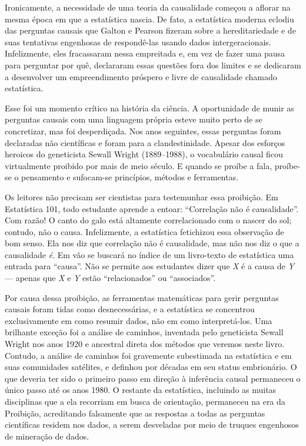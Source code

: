 \documentclass[11pt,a5paper,twoside]{book}
\begin{document}
Ironicamente, a necessidade de uma teoria da causalidade começou a aflorar na mesma época em que a estatística nascia. De fato, a estatística moderna eclodiu das perguntas causais que Galton e Pearson fizeram sobre a hereditariedade e de suas tentativas engenhosas de respondê-las usando dados intergeracionais. Infelizmente, eles fracassaram nessa empreitada e, em vez de fazer uma pausa para perguntar por quê, declararam essas questões fora dos limites e se dedicaram a desenvolver um empreendimento próspero e livre de causalidade chamado estatística.

Esse foi um momento crítico na história da ciência. A oportunidade de munir as perguntas causais com uma linguagem própria esteve muito perto de se concretizar, mas foi desperdiçada. Nos anos seguintes, essas perguntas foram declaradas não científicas e foram para a clandestinidade. Apesar dos esforços heroicos do geneticista Sewall Wright (1889–1988), o vocabulário causal ficou virtualmente proibido por mais de meio século. E quando se proíbe a fala, proíbe-se o pensamento e sufocam-se princípios, métodos e ferramentas.

Os leitores não precisam ser cientistas para testemunhar essa proibição. Em Estatística 101, todo estudante aprende a entoar: “Correlação não é causalidade”. Com razão! O canto do galo está altamente correlacionado com o nascer do sol; contudo, não o causa. Infelizmente, a estatística fetichizou essa observação de bom senso. Ela nos diz que correlação não é causalidade, mas não nos diz o que a causalidade \textit{é}. Em vão se buscará no índice de um livro-texto de estatística uma entrada para “causa”. Não se permite aos estudantes dizer que \textit{X} é a causa de \textit{Y} — apenas que \textit{X} e \textit{Y} estão “relacionados” ou “associados”.

Por causa dessa proibição, as ferramentas matemáticas para gerir perguntas causais foram tidas como desnecessárias, e a estatística se concentrou exclusivamente em como resumir dados, não em como interpretá-los. Uma brilhante exceção foi a análise de caminhos, inventada pelo geneticista Sewall Wright nos anos 1920 e ancestral direta dos métodos que veremos neste livro. Contudo, a análise de caminhos foi gravemente subestimada na estatística e em suas comunidades satélites, e definhou por décadas em seu status embrionário. O que deveria ter sido o primeiro passo em direção à inferência causal permaneceu o único passo até os anos 1980. O restante da estatística, incluindo as muitas disciplinas que a ela recorriam em busca de orientação, permaneceu na era da Proibição, acreditando falsamente que as respostas a todas as perguntas científicas residem nos dados, a serem desveladas por meio de truques engenhosos de mineração de dados.
\end{document}
